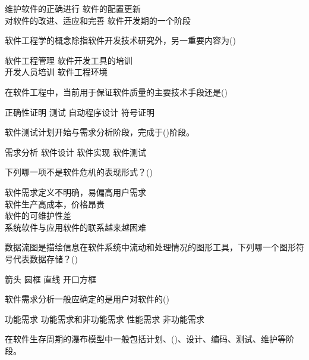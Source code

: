 \documentclass[answers]{exam}
\begin{document}
\begin{questions}
	\begin{oneparchoices}
		\choice 维护软件的正确进行
		\choice 软件的配置更新\\
		\correctchoice 对软件的改进、适应和完善
		\choice 软件开发期的一个阶段
	\end{oneparchoices}
	\question 软件工程学的概念除指软件开发技术研究外，另一重要内容为()\\
	\begin{oneparchoices}
		\correctchoice 软件工程管理
		\choice 软件开发工具的培训\\
		\choice 开发人员培训
		\choice 软件工程环境
	\end{oneparchoices}
	\question 在软件工程中，当前用于保证软件质量的主要技术手段还是()\\
	\begin{oneparchoices}
		\choice 正确性证明
		\correctchoice 测试
		\choice 自动程序设计
		\choice 符号证明
	\end{oneparchoices}
	\question 软件测试计划开始与需求分析阶段，完成于()阶段。\\
	\begin{oneparchoices}
		\choice 需求分析
		\choice 软件设计
		\choice 软件实现
		\correctchoice 软件测试
	\end{oneparchoices}
	\question 下列哪一项不是软件危机的表现形式？()\\
	\begin{oneparchoices}
		\choice 软件需求定义不明确，易偏高用户需求\\
		\choice 软件生产高成本，价格昂贵\\
		\choice 软件的可维护性差\\
		\correctchoice 系统软件与应用软件的联系越来越困难
	\end{oneparchoices}
	\question 数据流图是描绘信息在软件系统中流动和处理情况的图形工具，下列哪一个图形符号代表数据存储？()\\
	\begin{oneparchoices}
		\choice 箭头
		\choice 圆框
		\choice 直线
		\correctchoice 开口方框
	\end{oneparchoices}
	\question 软件需求分析一般应确定的是用户对软件的()\\
	\begin{oneparchoices}
		\choice 功能需求
		\correctchoice 功能需求和非功能需求
		\choice 性能需求
		\choice 非功能需求
	\end{oneparchoices}
	\question 在软件生存周期的瀑布模型中一般包括计划、()、设计、编码、测试、维护等阶段。\\
	\begin{oneparchoices}

\end{oneparchoices}
\end{questions}
\end{document}
